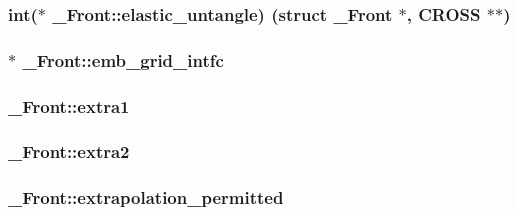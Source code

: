 \subsubsection[{\texorpdfstring{elastic\+\_\+untangle}{elastic_untangle}}]{\setlength{\rightskip}{0pt plus 5cm}int($\ast$ \+\_\+\+Front\+::elastic\+\_\+untangle) (struct {\bf \+\_\+\+Front} $\ast$, {\bf C\+R\+O\+SS} $\ast$$\ast$)}\hypertarget{struct___front_a4f491cae7cc790de04bc7d104c25cc7e}{}\label{struct___front_a4f491cae7cc790de04bc7d104c25cc7e}
\subsubsection[{\texorpdfstring{emb\+\_\+grid\+\_\+intfc}{emb_grid_intfc}}]{$\ast$ \+\_\+\+Front\+::emb\+\_\+grid\+\_\+intfc}\hypertarget{struct___front_aa5b9ce4edc92344d71e1787f717ba221}{}\label{struct___front_aa5b9ce4edc92344d71e1787f717ba221}
\subsubsection[{\texorpdfstring{extra1}{extra1}}]{ \+\_\+\+Front\+::extra1}\hypertarget{struct___front_aabb4a0661305685b0c559635609a0eec}{}\label{struct___front_aabb4a0661305685b0c559635609a0eec}
\subsubsection[{\texorpdfstring{extra2}{extra2}}]{ \+\_\+\+Front\+::extra2}\hypertarget{struct___front_a16182c0db00dcda2e054814d579d171b}{}\label{struct___front_a16182c0db00dcda2e054814d579d171b}
\subsubsection[{\texorpdfstring{extrapolation\+\_\+permitted}{extrapolation_permitted}}]{ \+\_\+\+Front\+::extrapolation\+\_\+permitted}\hypertarget{struct___front_a5123c635476c44094d83d6be1fb5f0cd}{}\label{struct___front_a5123c635476c44094d83d6be1fb5f0cd}
